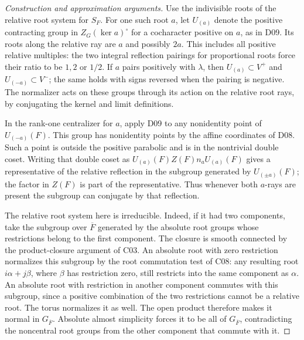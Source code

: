 \documentclass[11pt,a4paper,openany,oneside]{book}
\theoremstyle{resultstyle}
\theoremstyle{definition}
\numberwithin{equation}{chapter}
\begin{document}
\begin{proof}[Construction and approximation arguments]
Use the indivisible roots of the relative root system for
\(S_F\). For one such root \(a\), let \(U_{(a)}\) denote the
positive contracting group in \(Z_G(\ker a)^\circ\) for a
cocharacter positive on \(a\), as in D09. Its roots along
the relative ray are \(a\) and possibly \(2a\).
This includes all positive relative multiples: the two
integral reflection pairings for proportional roots force
their ratio to be \(1,2\) or \(1/2\). If \(a\) pairs
positively with \(\lambda\), then \(U_{(a)}\subset V^+\)
and \(U_{(-a)}\subset V^-\); the same holds with signs
reversed when the pairing is negative. The normalizer
acts on these groups through its action on the relative
root rays, by conjugating the kernel and limit definitions.

In the rank-one centralizer for \(a\), apply D09 to any
nonidentity point of \(U_{(-a)}(F)\). This group has
nonidentity points by the affine coordinates of D08.
Such a point is outside the positive parabolic and is in
the nontrivial double coset. Writing that double coset as
\(U_{(a)}(F)Z(F)n_aU_{(a)}(F)\) gives a representative
of the relative reflection in the subgroup generated by
\(U_{(\pm a)}(F)\); the factor in \(Z(F)\) is part of
the representative. Thus whenever both \(a\)-rays are
present the subgroup can conjugate by that reflection.

The relative root system here is irreducible. Indeed,
if it had two components, take the subgroup over
\(\overline F\) generated by the absolute root groups
whose restrictions belong to the first component.
The closure is smooth connected by the product-closure
argument of C03. An absolute root with zero restriction
normalizes this subgroup by the root commutation test
of C08: any resulting root \(i\alpha+j\beta\), where
\(\beta\) has restriction zero, still restricts into the
same component as \(\alpha\). An absolute root with
restriction in another component commutes with this
subgroup, since a positive combination of the two
restrictions cannot be a relative root. The torus
normalizes it as well. The open product therefore makes
it normal in \(G_{\overline F}\). Absolute almost
simplicity forces it to be all of \(G_{\overline F}\),
contradicting the noncentral root groups from the
other component that commute with it.


\end{proof}
\end{document}
